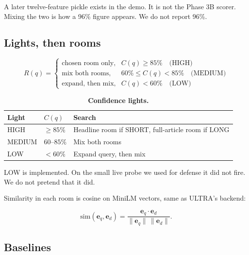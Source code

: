 A later twelve-feature pickle exists in the demo. It is not the Phase 3B scorer. Mixing the two is how a 96\% figure appears. We do not report 96\%.

\subsection*{Lights, then rooms}
\label{sec:tiered_routing}

\begin{equation}
R(q) =
\begin{cases}
\text{chosen room only}, & C(q) \geq 85\% \quad \text{(HIGH)} \\[4pt]
\text{mix both rooms}, & 60\% \leq C(q) < 85\% \quad \text{(MEDIUM)} \\[4pt]
\text{expand, then mix}, & C(q) < 60\% \quad \text{(LOW)}
\end{cases}
\label{eq:routing}
\end{equation}

\begin{table}[H]
\centering
\caption{\textbf{Confidence lights.}}
\label{tab:routing_tiers}
\small
\begin{tabular}{llp{5.2cm}}
\toprule
\textbf{Light} & \textbf{$C(q)$} & \textbf{Search} \\
\midrule
HIGH & $\geq 85\%$ & Headline room if SHORT, full-article room if LONG \\
MEDIUM & $60$--$85\%$ & Mix both rooms \\
LOW & $< 60\%$ & Expand query, then mix \\
\bottomrule
\end{tabular}
\end{table}

LOW is implemented. On the small live probe we used for defense it did not fire. We do not pretend that it did.

Similarity in each room is cosine on MiniLM vectors, same as ULTRA's backend:

\begin{equation}
\mathrm{sim}(\mathbf{e}_q, \mathbf{e}_d)
= \frac{\mathbf{e}_q \cdot \mathbf{e}_d}{\lVert\mathbf{e}_q\rVert\,\lVert\mathbf{e}_d\rVert}.
\label{eq:cosine}
\end{equation}

\subsection*{Baselines}
\label{sec:baselines}

